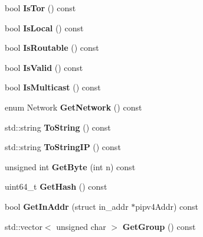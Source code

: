 \begin{DoxyCompactItemize}
\mbox{\label{class_c_net_addr_a4db37b4997ff3b8c57959f2aa915a9a3}} 
bool {\bfseries Is\+Tor} () const
\item 
\mbox{\label{class_c_net_addr_a857bfcf95814b7d6ef4db309c84f179d}} 
bool {\bfseries Is\+Local} () const
\item 
\mbox{\label{class_c_net_addr_a4e3b2fea2a6151c76684b3812df4a5c3}} 
bool {\bfseries Is\+Routable} () const
\item 
\mbox{\label{class_c_net_addr_a6fe20b8da9701ca5dc2af078e2e8ac25}} 
bool {\bfseries Is\+Valid} () const
\item 
\mbox{\label{class_c_net_addr_aabd54a329f70953f7895b56bcd000473}} 
bool {\bfseries Is\+Multicast} () const
\item 
\mbox{\label{class_c_net_addr_ad0162f2629f552a65acf934e1629c1db}} 
enum Network {\bfseries Get\+Network} () const
\item 
\mbox{\label{class_c_net_addr_a474ea3874554fe3b79f607fdef97c243}} 
std\+::string {\bfseries To\+String} () const
\item 
\mbox{\label{class_c_net_addr_a0c8d9b5ed3824546ff4dccca3b28b073}} 
std\+::string {\bfseries To\+String\+IP} () const
\item 
\mbox{\label{class_c_net_addr_acfd51ebf2030b01fa5ac133176512475}} 
unsigned int {\bfseries Get\+Byte} (int n) const
\item 
\mbox{\label{class_c_net_addr_a8fae7d32e83e9fbb9ce0216f896133c9}} 
uint64\+\_\+t {\bfseries Get\+Hash} () const
\item 
\mbox{\label{class_c_net_addr_a4f73432c55d4acb6b9e4c54833eefea6}} 
bool {\bfseries Get\+In\+Addr} (struct in\+\_\+addr $\ast$pipv4\+Addr) const
\item 
\mbox{\label{class_c_net_addr_a6f8211515f809f6972ce327433d41458}} 
std\+::vector$<$ unsigned char $>$ {\bfseries Get\+Group} () const

\end{DoxyCompactItemize}
